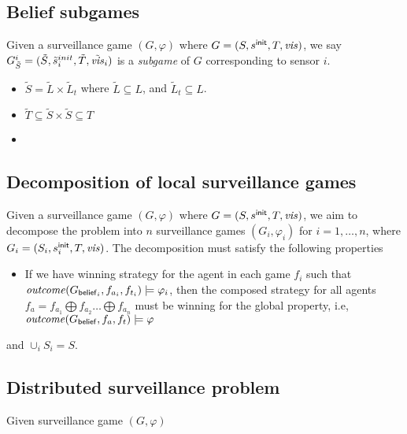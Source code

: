 \subsection{Belief subgames}
Given a surveillance game $(G,\varphi)$ where $G = (S,s^{\mathsf{init}},T,\mathit{vis})$, we say $G^{i}_{\tilde{S}} = (\tilde{S},\tilde{s}_i^{init},\tilde{T},\tilde{\mathit{vis}}_i)$ is a \emph{subgame} of $G$ corresponding to sensor $i$. 

\begin{itemize}
\item $\tilde{S}= \tilde{L} \times \tilde{L}_t$ where $\tilde{L}\subseteq L$, and $\tilde{L}_t \subseteq L$. 
\item $\tilde{T} \subseteq \tilde{S} \times \tilde{S} \subseteq T$
\item 
\end{itemize}



\subsection{Decomposition of local surveillance games}
Given a surveillance game $(G,\varphi)$ where $G = (S,s^{\mathsf{init}},T,\mathit{vis})$, we aim to decompose the problem into $n$ surveillance games $(G_i,\varphi_i)$ for $i = 1,\dots,n$, where $G_i = (S_i,s^{\mathsf{init}}_i,T,\mathit{vis})$. The decomposition must satisfy the following properties
\begin{itemize}
\item If we have winning strategy for the agent in each game $f_i$ such that $\mathit{outcome}(G_{\mathsf{belief}_i},f_{a_i},f_{t_i}) \models \varphi_i$, then the composed strategy for all agents $f_a = f_{a_1} \bigoplus f_{a_2} \dots \bigoplus f_{a_n}$ must be winning for the global property, i.e, $\mathit{outcome}(G_{\mathsf{belief}},f_{a},f_{t}) \models \varphi$
\end{itemize}


and $\cup_iS_i = S$. 



\subsection{Distributed surveillance problem}



Given surveillance game  $(G,\varphi)$